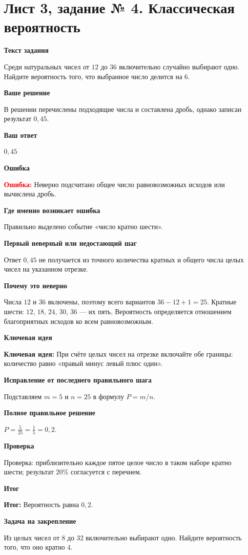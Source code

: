 \documentclass[11pt,a4paper]{article}
\newcommand{\Idea}{\textcolor{blue!60!black}{\textbf{Ключевая идея:}}}
\newcommand{\Res}{\textcolor{teal!60!black}{\textbf{Итог:}}}
\newcommand{\Heading}[2]{\par\medskip\textbf{#1}\par#2\par}
\begin{document}
\section*{Лист 3, задание № 4. Классическая вероятность}
\Heading{Текст задания}{Среди натуральных чисел от $12$ до $36$ включительно случайно выбирают одно. Найдите вероятность того, что выбранное число делится на $6$.}
\Heading{Ваше решение}{В решении перечислены подходящие числа и составлена дробь, однако записан результат $0{,}45$.}
\Heading{Ваш ответ}{$0{,}45$}
\Heading{Ошибка}{\textcolor{red}{\textbf{Ошибка:}} Неверно подсчитано общее число равновозможных исходов или вычислена дробь.}
\Heading{Где именно возникает ошибка}{Правильно выделено событие «число кратно шести».}
\Heading{Первый неверный или недостающий шаг}{Ответ $0{,}45$ не получается из точного количества кратных и общего числа целых чисел на указанном отрезке.}
\Heading{Почему это неверно}{Числа $12$ и $36$ включены, поэтому всего вариантов $36-12+1=25$. Кратные шести: $12$, $18$, $24$, $30$, $36$ --- их пять. Вероятность определяется отношением благоприятных исходов ко всем равновозможным.}
\Heading{Ключевая идея}{\Idea{} При счёте целых чисел на отрезке включайте обе границы: количество равно «правый минус левый плюс один».}
\Heading{Исправление от последнего правильного шага}{Подставляем $m=5$ и $n=25$ в формулу $P=m/n$.}
\Heading{Полное правильное решение}{$P=\frac5{25}=\frac15=0{,}2$.}
\Heading{Проверка}{Проверка: приблизительно каждое пятое целое число в таком наборе кратно шести; результат $20\%$ согласуется с перечнем.}
\Heading{Итог}{\Res{} Вероятность равна $0{,}2$.}
\Heading{Задача на закрепление}{Из целых чисел от $8$ до $32$ включительно выбирают одно. Найдите вероятность того, что оно кратно $4$.}
\newpage
{}\label{task:3_5}
\end{document}
